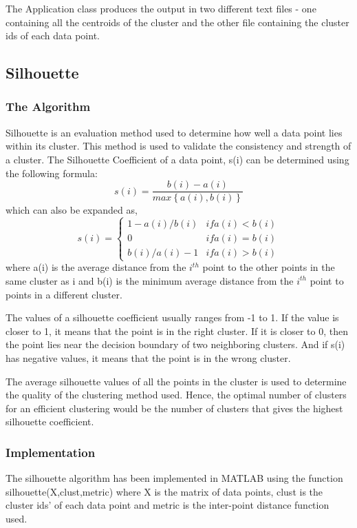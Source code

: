\documentclass{lmproj}
\begin{document}
The Application class produces the output in two different text files - one containing all the centroids of the cluster and the other file containing the cluster ids of each data point.

\subsection{Silhouette}
\subsubsection{The Algorithm}
Silhouette is an evaluation method used to determine how well a data point lies within its cluster. This method is used to validate the consistency and strength of a cluster. The Silhouette Coefficient of a data point, s(i) can be determined using the following formula:
\begin{equation}
s(i) = \frac{b(i) - a(i)}{max\left\{a(i), b(i)\right\}}
\end{equation}
which can also be expanded as,
\begin{equation}
s(i) = \begin{cases}
1-a(i)/b(i) & if a(i)<b(i)
\\0 & if a(i)=b(i)
\\b(i)/a(i) -1 & if a(i)>b(i)
\end{cases}
\end{equation}
where a(i) is the average distance from the $i^{th}$ point to the other points in the same cluster as i and b(i) is the minimum average distance from the $i^{th}$ point to points in a different cluster.

The values of a silhouette coefficient usually ranges from -1 to 1. If the value is closer to 1, it means that the point is in the right cluster. If it is closer to 0, then the point lies near the decision boundary of two neighboring clusters. And if s(i) has negative values, it means that the point is in the wrong cluster.

The average silhouette values of all the points in the cluster is used to determine the quality of the clustering method used. Hence, the optimal number of clusters for an efficient clustering would be the number of clusters that gives the highest silhouette coefficient.
\subsubsection{Implementation}
The silhouette algorithm has been implemented in MATLAB using the function silhouette(X,clust,metric) where X is the matrix of data points, clust is the cluster ids’ of each data point and metric is the inter-point distance function used. 
\end{document}
